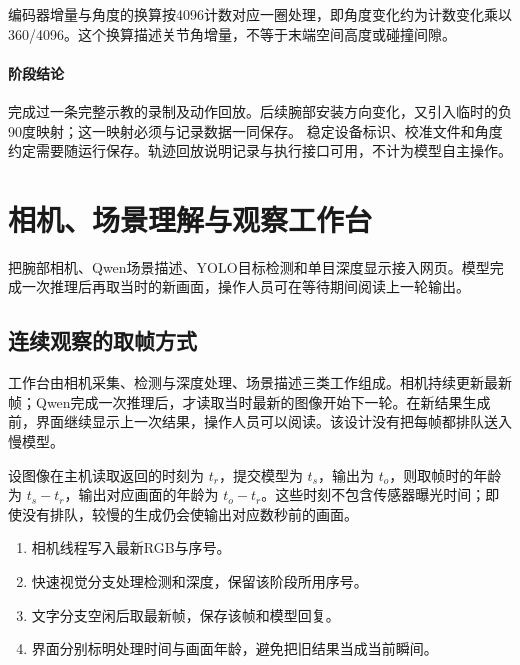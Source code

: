 编码器增量与角度的换算按4096计数对应一圈处理，即角度变化约为计数变化乘以360/4096。这个换算描述关节角增量，不等于末端空间高度或碰撞间隙。


\paragraph{阶段结论}完成过一条完整示教的录制及动作回放。后续腕部安装方向变化，又引入临时的负90度映射；这一映射必须与记录数据一同保存。 稳定设备标识、校准文件和角度约定需要随运行保存。轨迹回放说明记录与执行接口可用，不计为模型自主操作。


\FloatBarrier

\section{相机、场景理解与观察工作台}

\label{stage:s02}

把腕部相机、Qwen场景描述、YOLO目标检测和单目深度显示接入网页。模型完成一次推理后再取当时的新画面，操作人员可在等待期间阅读上一轮输出。

\subsection{连续观察的取帧方式}\label{s02-detail-1}

工作台由相机采集、检测与深度处理、场景描述三类工作组成。相机持续更新最新帧；Qwen完成一次推理后，才读取当时最新的图像开始下一轮。在新结果生成前，界面继续显示上一次结果，操作人员可以阅读。该设计没有把每帧都排队送入慢模型。

设图像在主机读取返回的时刻为 \(t_r\)，提交模型为 \(t_s\)，输出为 \(t_o\)，则取帧时的年龄为 \(t_s-t_r\)，输出对应画面的年龄为 \(t_o-t_r\)。这些时刻不包含传感器曝光时间；即使没有排队，较慢的生成仍会使输出对应数秒前的画面。

\begin{enumerate}
\def\labelenumi{\arabic{enumi}.}
\tightlist
\item
  相机线程写入最新RGB与序号。
\item
  快速视觉分支处理检测和深度，保留该阶段所用序号。
\item
  文字分支空闲后取最新帧，保存该帧和模型回复。
\item
  界面分别标明处理时间与画面年龄，避免把旧结果当成当前瞬间。
\end{enumerate}

